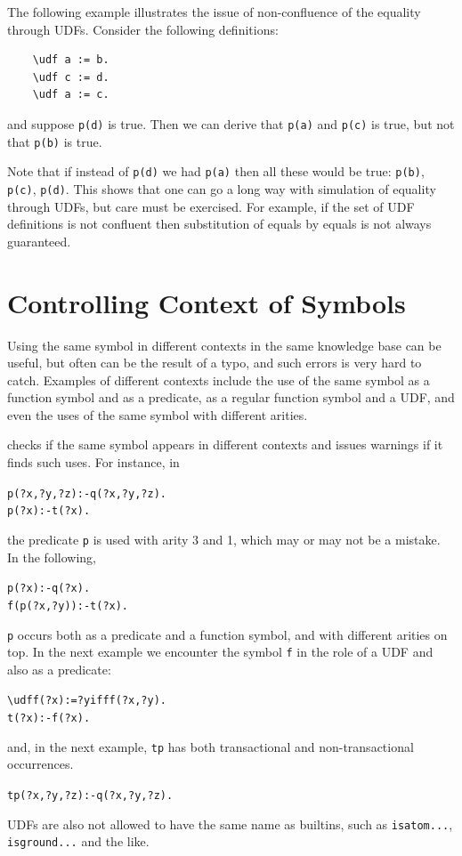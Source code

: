 \documentclass[11pt]{article}
\newcommand{\ERGO}{\mbox{\smaller{\ensuremath{\cal{E}}\smaller{{\sc{RGO}}}}}\xspace}
\newcommand{\FLSYSTEM}{\ERGO}
\newcommand{\bs}{\textbackslash}
\begin{document}
The following example illustrates the issue of non-confluence of the
equality through UDFs. Consider the following definitions:
\begin{verbatim}
    \udf a := b.
    \udf c := d.
    \udf a := c.
\end{verbatim}
and suppose \texttt{p(d)} is true. Then we can derive that \texttt{p(a)}
and \texttt{p(c)} is true, but not that \texttt{p(b)} is true.    

Note that if instead of \texttt{p(d)} we had \texttt{p(a)} then all these
would be true: \texttt{p(b)}, \texttt{p(c)}, \texttt{p(d)}.
This shows that one can go a long way
with simulation of equality through UDFs, but care must be exercised.
For example, if the set of UDF definitions is not confluent then
substitution of equals by equals is not always guaranteed.


\section{Controlling Context of Symbols} \label{sec:symbol}


Using the same symbol in different contexts in the same knowledge base can be
useful, but often can be the result of a typo, and such errors is very hard
to catch. Examples of different contexts include the use of the same symbol
as a function symbol and as a predicate, as a regular function symbol and a
UDF, and even the uses of the same symbol with different arities.

\FLSYSTEM checks if the same symbol appears in different contexts
and issues warnings if it finds such uses. For instance, in
\begin{alltt}
	p(?x,?y,?z):-q(?x,?y,?z).
	p(?x):-t(?x).
\end{alltt}
the predicate \texttt{p} is used with arity 3 and 1, which may or may not be a
mistake. In the following,
\begin{alltt}
	p(?x):-q(?x).
	f(p(?x,?y)):-t(?x).
\end{alltt}
\texttt{p} occurs both as a predicate and a function symbol, and with
different arities on top. In the next example we encounter the symbol
\texttt{f} in the role of a UDF and also as a predicate:  
\begin{alltt}
	\bs{}udf f(?x):=?y if ff(?x,?y).
	t(?x):-f(?x).
\end{alltt}
and, in the next example, \texttt{tp} has both transactional and
non-transactional occurrences. 
\begin{alltt}
	tp(?x,?y,?z):-q(?x,?y,?z).
\end{alltt}
UDFs are also not allowed to have the same name as \FLSYSTEM builtins, such
as \texttt{isatom{...}}, \texttt{isground{...}} and the like.  
\end{document}
